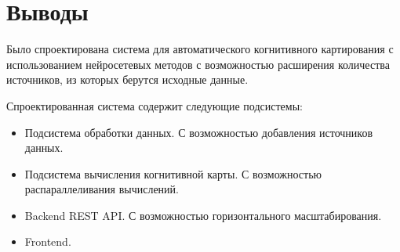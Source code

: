 





\section{Выводы}
Было спроектирована система для автоматического когнитивного картирования с
использованием нейросетевых методов с возможностью расширения количества
источников, из которых берутся исходные данные.

Спроектированная система содержит следующие подсистемы:
\begin{itemize}
	\item Подсистема обработки данных. С возможностью добавления источников данных.
	\item Подсистема вычисления когнитивной карты. С возможностью распараллеливания вычислений.
	\item Backend REST API. С возможностью горизонтального масштабирования.
	\item Frontend.
\end{itemize}
